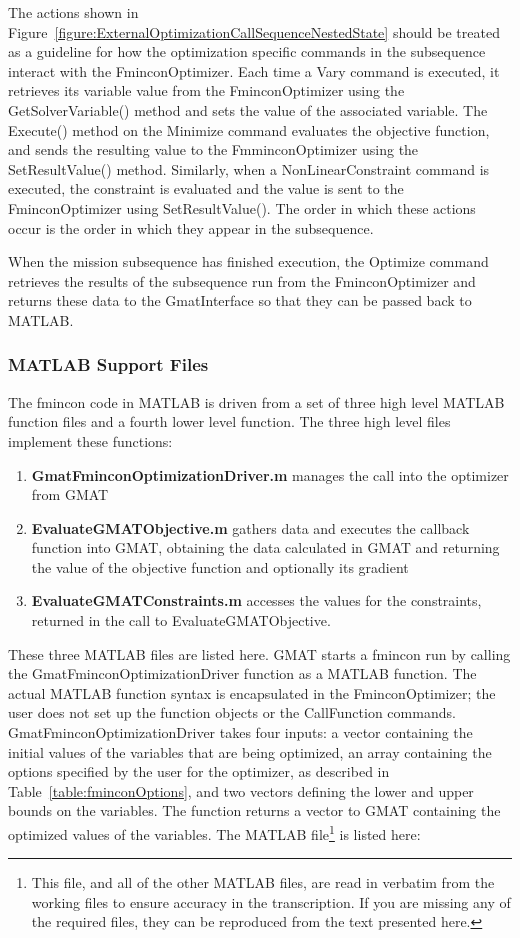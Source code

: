 The actions shown in Figure~\ref{figure:ExternalOptimizationCallSequenceNestedState} should be
treated as a guideline for how the optimization specific commands in the subsequence interact with
the FminconOptimizer. Each time a Vary command is executed, it retrieves its variable value from
the FminconOptimizer using the GetSolverVariable() method and sets the value of the associated
variable.  The Execute() method on the Minimize command evaluates the objective function, and sends
the resulting value to the FmminconOptimizer using the SetResultValue() method.  Similarly, when a
NonLinearConstraint command is executed, the constraint is evaluated and the value is sent to the
FminconOptimizer using SetResultValue().  The order in which these actions occur is the order in
which they appear in the subsequence.

When the mission subsequence has finished execution, the Optimize command retrieves the results of
the subsequence run from the FminconOptimizer and returns these data to the GmatInterface so that
they can be passed back to MATLAB.

\subsubsection{MATLAB Support Files}

The fmincon code in MATLAB is driven from a set of three high level MATLAB function files and a
fourth lower level function.  The three high level files implement these functions:
\begin{enumerate}
\item \textbf{GmatFminconOptimizationDriver.m} manages the call into the optimizer from GMAT
\item \textbf{EvaluateGMATObjective.m} gathers data and executes the callback function into GMAT,
obtaining the data calculated in GMAT and returning the value of the objective function and
optionally its gradient
\item \textbf{EvaluateGMATConstraints.m} accesses the values for the constraints, returned in the
call to EvaluateGMATObjective.
\end{enumerate}

These three MATLAB files are listed here.  GMAT starts a fmincon run by calling the
GmatFminconOptimizationDriver function as a MATLAB function.  The actual MATLAB function syntax is
encapsulated in the FminconOptimizer; the user does not set up the function objects or the
CallFunction commands.  GmatFminconOptimizationDriver takes four inputs: a vector containing the
initial values of the variables that are being optimized, an array containing the options specified
by the user for the optimizer, as described in Table~\ref{table:fminconOptions}, and two vectors
defining the lower and upper bounds on the variables.  The function returns a vector to GMAT
containing the optimized values of the variables. The MATLAB file\footnote{This file, and all of the
other MATLAB files, are read in verbatim from the working files to ensure accuracy in the
transcription.  If you are missing any of the required files, they can be reproduced from the text
presented here.} is listed here:

